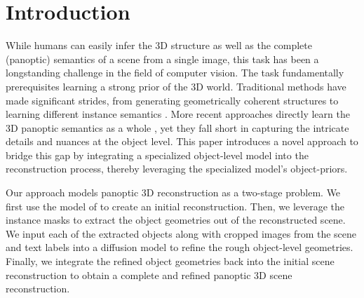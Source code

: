 \section{Introduction}
\label{sec:intro}


While humans can easily infer the 3D structure as well as the complete (panoptic) semantics of a scene from a single image, this task has been a longstanding
challenge in the field of computer vision. The task fundamentally prerequisites learning a strong prior of the 3D world. Traditional methods have made significant strides,
from generating geometrically coherent structures \citep{denninger20203d, shin20193d} to learning different instance semantics \citep{gkioxari2019mesh, kuo2020mask2cad,
nie2020total3dunderstanding}. More recent approaches directly learn the 3D panoptic semantics as a whole \citep{dahnert2021panoptic, zhang2023uni}, yet they fall short in capturing the intricate details and nuances at the object level.
This paper introduces a novel approach to bridge this gap by integrating a specialized object-level model into the reconstruction process, thereby leveraging the specialized model's object-priors.

Our approach models panoptic 3D reconstruction as a two-stage problem. We first use the model of \citet{dahnert2021panoptic} to create an initial reconstruction. Then, we leverage the instance masks to extract the object geometries out of the reconstructed scene. We input each of the extracted objects along with cropped images from the scene and text labels into a diffusion model \citep{cheng2023sdfusion} to refine the rough object-level geometries.
Finally, we integrate the refined object geometries back into the initial scene reconstruction to obtain a complete and refined panoptic 3D scene reconstruction.

